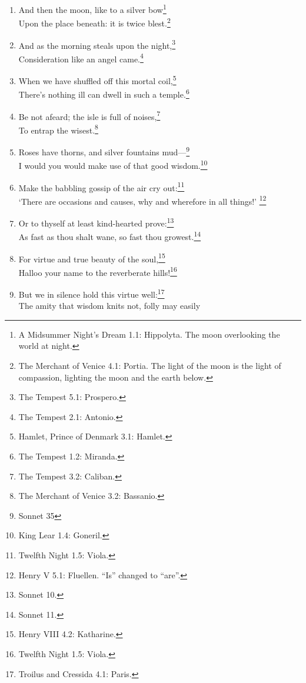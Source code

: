 \documentclass[17pt,twoside]{extarticle}
\begin{document}
\begin{enumerate}
  Smiling at grief:\footnote{Twelfth Night 2.4: Viola.} Awake,
  awake!\footnote{The Tempest 2.1: Ariel.}\\In delay there lies no
  plenty.\footnote{Twelfth Night 2.3: Feste.}
\item
  And then the moon, like to a silver bow\footnote{A Midsummer Night's
    Dream 1.1: Hippolyta. The moon overlooking the world at night.}\\Upon
  the place beneath: it is twice blest.\footnote{The Merchant of Venice
    4.1: Portia. The light of the moon is the light of compassion,
    lighting the moon and the earth below.}
\item
  And as the morning steals upon the night,\footnote{The Tempest 5.1:
    Prospero.}\\Consideration like an angel came.\footnote{The Tempest
    2.1: Antonio.}
\item
  When we have shuffled off this mortal coil,\footnote{Hamlet, Prince of
    Denmark 3.1: Hamlet.}\\There's nothing ill can dwell in such a
  temple.\footnote{The Tempest 1.2: Miranda.}
\item
  Be not afeard; the isle is full of noises,\footnote{The Tempest 3.2:
    Caliban.}\\To entrap the wisest.\footnote{The Merchant of Venice
    3.2: Bassanio.}
\item
  Roses have thorns, and silver fountains mud---\footnote{Sonnet 35}\\I
  would you would make use of that good wisdom.\footnote{King Lear 1.4:
    Goneril.}
\item
  Make the babbling gossip of the air cry out:\footnote{Twelfth Night
    1.5: Viola.}\\`There are occasions and causes, why and wherefore in
  all things!' \footnote{Henry V 5.1: Fluellen. ``Is'' changed to
    ``are''.}
\item
  Or to thyself at least kind-hearted prove:\footnote{Sonnet 10.}\\As
  fast as thou shalt wane, so fast thou growest.\footnote{Sonnet 11.}
\item
  For virtue and true beauty of the soul,\footnote{Henry VIII 4.2:
    Katharine.}\\Halloo your name to the reverberate hills!\footnote{Twelfth
    Night 1.5: Viola.}
\item
  But we in silence hold this virtue well:\footnote{Troilus and Cressida
    4.1: Paris.}\\The amity that wisdom knits not, folly may easily

\end{enumerate}
\end{document}
